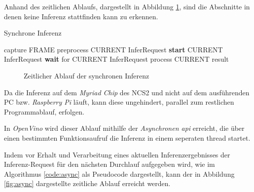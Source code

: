 Anhand des zeitlichen Ablaufs, dargestellt in Abbildung
\ref{fig:sync}, sind die Abschnitte in denen
keine Inferenz stattfinden kann zu erkennen.

\vspace{1cm}
\begin{minipage}{0.1\textwidth}
  \hfill
\end{minipage}
\begin{minipage}{0.5\textwidth}
  \begin{algorithm}[H]
    \caption{Synchrone Inferenz}
    \label{code:sync}
    \begin{algorithmic}
    \WHILE{\TRUE}
        \STATE capture FRAME
        \STATE preprocess CURRENT InferRequest
        \STATE \textbf{start} CURRENT InferRequest
        \STATE \textbf{wait} for CURRENT InferRequest
        \STATE process CURRENT result
    \ENDWHILE
    \end{algorithmic}
  \end{algorithm}  
\end{minipage}
\begin{minipage}{0.4\textwidth}
  \centering
  \vspace{1cm}
  \def\svgwidth{0.5\textwidth}
  
\end{minipage}

\vspace{1cm}
\begin{figure}[H]
  \centering
  \def\svgwidth{0.9\textwidth}
  
  \caption{Zeitlicher Ablauf der synchronen Inferenz}
  \label{fig:sync}
\end{figure}


Da die Inferenz auf dem \textit{Myriad Chip} des NCS2
und nicht auf dem ausführenden PC bzw. \textit{Raspberry Pi} läuft,
kann diese ungehindert, parallel zum restlichen Programmablauf, 
erfolgen.

In \textit{OpenVino} wird dieser Ablauf mithilfe
 der \textit{Asynchronen \Gls{api}}
erreicht, die über einen bestimmten Funktionsaufruf
die Inferenz in einem seperaten \Gls{thread} startet.

Indem vor Erhalt und Verarbeitung eines aktuellen 
Inferenzergebnisses der Inferenz-Request für
den nächsten Durchlauf aufgegeben wird, wie im Algorithmus
\ref{code:async} als Pseudocode dargestellt, kann der in
Abbildung \ref{fig:async} dargestellte zeitliche Ablauf
erreicht werden.
\vspace{1cm}


